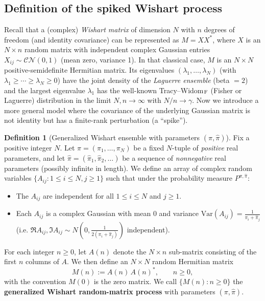 \documentclass[letterpaper,11pt,oneside,reqno]{article}
\numberwithin{equation}{section}
\theoremstyle{definition}
\newtheorem{definition}[proposition]{Definition}
\begin{document}
\subsection{Definition of the spiked Wishart process}

Recall that a (complex) \emph{Wishart matrix} of dimension $N$ with $n$ degrees of freedom (and identity covariance) can be represented as $M = X X^*$, where $X$ is an $N\times n$ random matrix with independent complex Gaussian entries $X_{ij}\sim \mathcal{CN}(0,1)$ (mean zero, variance 1). In that classical case, $M$ is an $N\times N$ positive-semidefinite Hermitian matrix. Its eigenvalues $(\lambda_1,\dots,\lambda_N)$ (with $\lambda_1\ge \cdots \ge \lambda_N \ge 0$) have the joint density of the \emph{Laguerre ensemble} (beta $=2$) and the largest eigenvalue $\lambda_1$ has the well-known Tracy--Widom$_{\rm F}$ (Fisher or Laguerre) distribution in the limit $N,n\to\infty$ with $N/n\to\gamma$. Now we introduce a more general model where the covariance of the underlying Gaussian matrix is not identity but has a finite-rank perturbation (a ``spike'').

\begin{definition}[Generalized Wishart ensemble with parameters $(\pi,\hat\pi)$]\label{def:Wishart}
Fix a positive integer $N$. Let $\pi=(\pi_1,\dots,\pi_N)$ be a fixed $N$-tuple of \emph{positive} real parameters, and let $\hat\pi = (\hat\pi_1,\hat\pi_2,\dots)$ be a sequence of \emph{nonnegative} real parameters (possibly infinite in length). We define an array of complex random variables $\{A_{ij}: 1\le i\le N, j\ge 1\}$ such that under the probability measure $P^{\pi,\hat\pi}$:
\begin{itemize}\item The $A_{ij}$ are independent for all $1\le i\le N$ and $j\ge 1$.
\item Each $A_{ij}$ is a complex Gaussian with mean $0$ and variance $\mathrm{Var}(A_{ij}) = \frac{1}{\pi_i + \hat\pi_j}$ (i.e. $\Re A_{ij}, \Im A_{ij} \sim N(0,\frac{1}{2(\pi_i+\hat\pi_j)})$ independent).
\end{itemize}
For each integer $n\ge 0$, let $A(n)$ denote the $N\times n$ sub-matrix consisting of the first $n$ columns of $A$. We then define an $N\times N$ random Hermitian matrix
\[ M(n) := A(n)\,A(n)^*, \qquad n\ge 0, \]
with the convention $M(0)$ is the zero matrix. We call $\{M(n): n\ge 0\}$ the \textbf{generalized Wishart random-matrix process} with parameters $(\pi,\hat\pi)$.
\end{definition}
\end{document}
